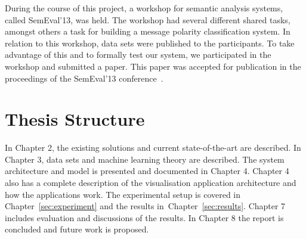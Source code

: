 During the course of this project, a workshop for semantic analysis systems, called SemEval'13, was held. The workshop had several different shared tasks, amongst others a task for building a message polarity classification system. In relation to this workshop, data sets were published to the participants. To take advantage of this and to formally test our system, we participated in the workshop and submitted a paper. This paper was accepted for publication in the proceedings of the SemEval'13 conference~\citep{selmer-EtAl:2013:SemEval-2013}.

\section{Thesis Structure}
\label{sec:structure}

In Chapter 2, the existing solutions and current state-of-the-art are described. In Chapter 3, data sets and machine learning theory are described. The system architecture and model is presented and documented in Chapter 4. Chapter 4 also has a complete description of the visualisation application architecture and how the applications work. The experimental setup is covered in Chapter~\ref{sec:experiment} and the results in~Chapter~\ref{sec:results}. Chapter 7 includes evaluation and discussions of the results. In Chapter 8 the report is concluded and future work is proposed. 






